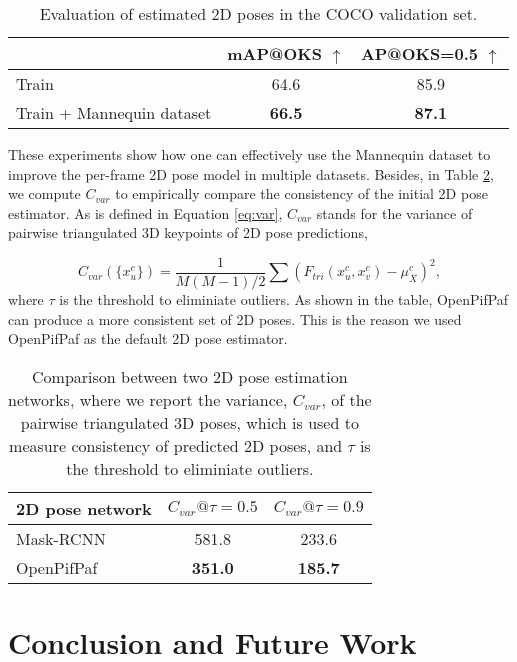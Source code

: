 \documentclass{article}
\begin{document}
\begin{table}[h]
\centering
\begin{tabular}{l|cc} \hline \hline
& mAP@OKS $\uparrow$  & AP@OKS=0.5 $\uparrow$ \\ \hline
Train & 64.6 & 85.9 \\
Train + Mannequin dataset & \textbf{66.5} & \textbf{87.1} \\ \hline \hline
\end{tabular}
\caption{Evaluation of estimated 2D poses in the COCO validation set.}\label{tab:evalution2}
\end{table}




These experiments show how one can effectively use the Mannequin dataset
to improve the per-frame 2D pose model in multiple datasets.  Besides, in Table
\ref{tab:2d-consistency}, we compute $C_{var}$ to empirically compare the consistency of the initial 2D pose estimator. As is defined in Equation \ref{eq:var}, $C_{var}$ stands for the variance of pairwise triangulated 3D keypoints of 2D pose predictions,

\begin{equation} \label{eq:var}
    C_{var}(\{x_u^c\}) = \frac{1}{M(M-1)/2} \sum (F_{tri}(x_u^c, x_v^c) - \mu_X^c)^2,
\end{equation}
where $\tau$ is the threshold to eliminiate outliers.  As shown
in the table, OpenPifPaf can produce a more consistent set of 2D poses.
This is the reason we used OpenPifPaf as the default 2D pose estimator. 

\begin{table}[h] \centering
\begin{tabular}{l|cc}\hline\hline
2D pose network & $C_{var}@\tau=0.5$ & $C_{var}@\tau=0.9$ \\ \hline \hline
Mask-RCNN \cite{he2017mask} & 581.8 & 233.6 \\
OpenPifPaf \cite{kreiss2019pifpaf} & \textbf{351.0} & \textbf{185.7} \\ \hline \hline
\end{tabular}
\caption{Comparison between two 2D pose estimation networks, where we
report the variance, $C_{var}$, of the pairwise triangulated 3D poses,
which is used to measure consistency of predicted 2D poses, and $\tau$
is the threshold to eliminiate outliers.} \label{tab:2d-consistency}
\end{table}


\section{Conclusion and Future Work}\label{sec:conclusion}
\end{document}
